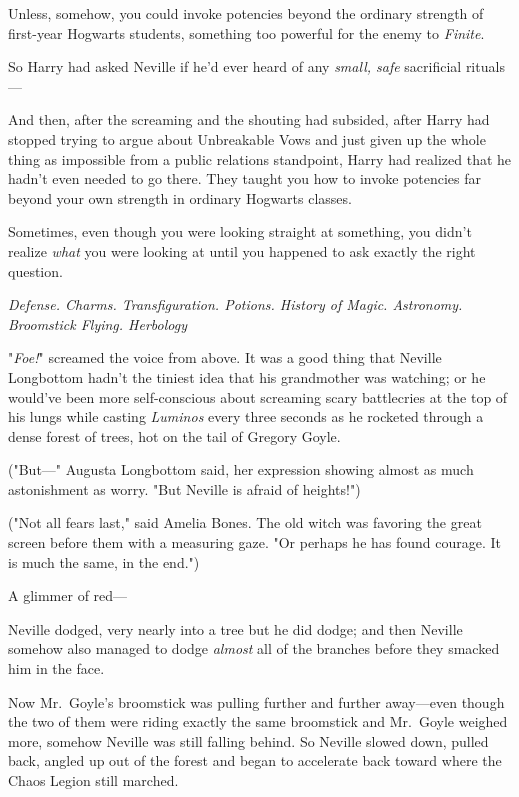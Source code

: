 Unless, somehow, you could invoke potencies beyond the ordinary strength of
first-year Hogwarts students, something too powerful for the enemy to
\emph{Finite}.

So Harry had asked Neville if he'd ever heard of any \emph{small, safe}
sacrificial rituals---

And then, after the screaming and the shouting had subsided, after Harry had
stopped trying to argue about Unbreakable Vows and just given up the whole
thing as impossible from a public relations standpoint, Harry had realized that
he hadn't even needed to go there. They taught you how to invoke potencies far
beyond your own strength in ordinary Hogwarts classes.

Sometimes, even though you were looking straight at something, you didn't
realize \emph{what} you were looking at until you happened to ask exactly the
right question.

\emph{Defense. Charms. Transfiguration. Potions. History of Magic. Astronomy.
Broomstick Flying. Herbology{\el}}

"\emph{Foe!}" screamed the voice from above.
\sbreak
It was a good thing that Neville Longbottom hadn't the tiniest idea that his
grandmother was watching; or he would've been more self-conscious about
screaming scary battlecries at the top of his lungs while casting
\emph{Luminos} every three seconds as he rocketed through a dense forest of
trees, hot on the tail of Gregory Goyle.

("But---" Augusta Longbottom said, her expression showing almost as much
astonishment as worry. "But Neville is afraid of heights!")

("Not all fears last," said Amelia Bones. The old witch was favoring the great
screen before them with a measuring gaze. "Or perhaps he has found courage. It
is much the same, in the end.")

A glimmer of red---

Neville dodged, very nearly into a tree but he did dodge; and then Neville
somehow also managed to dodge \emph{almost} all of the branches before they
smacked him in the face.

Now Mr.~Goyle's broomstick was pulling further and further away---even though
the two of them were riding exactly the same broomstick and Mr.~Goyle weighed
more, somehow Neville was still falling behind. So Neville slowed down, pulled
back, angled up out of the forest and began to accelerate back toward where the
Chaos Legion still marched.

